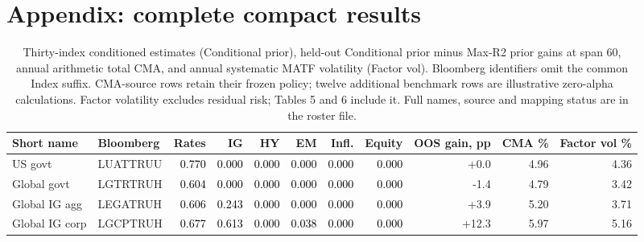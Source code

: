 \documentclass[a4paper,review]{cas-sc}
\begin{document}
\FloatBarrier\section{Appendix: complete compact results}

\begin{table}[pos=htbp]
\centering
\small
\setlength{\tabcolsep}{3pt}
\caption{Thirty-index conditioned estimates (Conditional prior), held-out Conditional prior minus Max-R2 prior gains at span 60, annual arithmetic total CMA, and annual systematic MATF volatility (Factor vol). Bloomberg identifiers omit the common Index suffix. CMA-source rows retain their frozen policy; twelve additional benchmark rows are illustrative zero-alpha calculations. Factor volatility excludes residual risk; Tables 5 and 6 include it. Full names, source and mapping status are in the roster file.}
\begin{adjustbox}{max width=\linewidth}
\begin{tabular}{llrrrrrrrrr}
\toprule
Short name & Bloomberg & Rates & IG & HY & EM & Infl. & Equity & OOS gain, pp & CMA \% & Factor vol \% \\
\midrule
US govt & LUATTRUU & \cellcolor[HTML]{E37E64}\textcolor{black}{0.770} & \cellcolor[HTML]{FFFFFF}\textcolor{black}{0.000} & \cellcolor[HTML]{FFFFFF}\textcolor{black}{0.000} & \cellcolor[HTML]{FFFFFF}\textcolor{black}{0.000} & \cellcolor[HTML]{FFFFFF}\textcolor{black}{0.000} & \cellcolor[HTML]{FFFFFF}\textcolor{black}{0.000} & +0.0 & 4.96 & 4.36 \\
Global govt & LGTRTRUH & \cellcolor[HTML]{F3A481}\textcolor{black}{0.604} & \cellcolor[HTML]{FFFFFF}\textcolor{black}{0.000} & \cellcolor[HTML]{FFFFFF}\textcolor{black}{0.000} & \cellcolor[HTML]{FFFFFF}\textcolor{black}{0.000} & \cellcolor[HTML]{FFFFFF}\textcolor{black}{0.000} & \cellcolor[HTML]{FFFFFF}\textcolor{black}{0.000} & -1.4 & 4.79 & 3.42 \\
Global IG agg & LEGATRUH & \cellcolor[HTML]{F3A481}\textcolor{black}{0.606} & \cellcolor[HTML]{FCE0D0}\textcolor{black}{0.243} & \cellcolor[HTML]{FFFFFF}\textcolor{black}{0.000} & \cellcolor[HTML]{FFFFFF}\textcolor{black}{0.000} & \cellcolor[HTML]{FFFFFF}\textcolor{black}{0.000} & \cellcolor[HTML]{FFFFFF}\textcolor{black}{0.000} & +3.9 & 5.20 & 3.71 \\
Global IG corp & LGCPTRUH & \cellcolor[HTML]{EC9374}\textcolor{black}{0.677} & \cellcolor[HTML]{F2A17F}\textcolor{black}{0.613} & \cellcolor[HTML]{FFFFFF}\textcolor{black}{0.000} & \cellcolor[HTML]{F8F3F0}\textcolor{black}{0.038} & \cellcolor[HTML]{FFFFFF}\textcolor{black}{0.000} & \cellcolor[HTML]{FFFFFF}\textcolor{black}{0.000} & +12.3 & 5.97 & 5.16 \\

\end{tabular}
\end{adjustbox}
\end{table}
\end{document}
